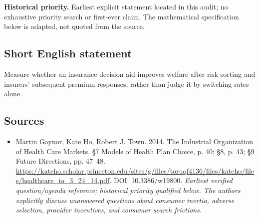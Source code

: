 \documentclass[11pt]{article}
\begin{document}
\par\textbf{Historical priority.} Earliest explicit statement located in this audit; no exhaustive priority search or first-ever claim. The mathematical specification below is adapted, not quoted from the source.

\subsection{Short English statement}
Measure whether an insurance decision aid improves welfare after risk sorting and insurers’ subsequent premium responses, rather than judge it by switching rates alone.

\subsection{Sources}
\begin{itemize}\raggedright
\item[\textnormal{[S1]}]\hypertarget{source:30007724:1}{} Martin Gaynor, Kate Ho, Robert J. Town. 2014. The Industrial Organization of Health Care Markets. §7 Models of Health Plan Choice, p. 40; §8, p. 43; §9 Future Directions, pp. 47–48.
\url{https://kateho.scholar.princeton.edu/sites/g/files/toruqf4136/files/kateho/files/healthcare_io_3_24_14.pdf}.
DOI: 10.3386/w19800.
{\small\textit{Earliest verified question/agenda reference; historical priority qualified below. The authors explicitly discuss unanswered questions about consumer inertia, adverse selection, provider incentives, and consumer search frictions.}}
\end{itemize}
\end{document}
